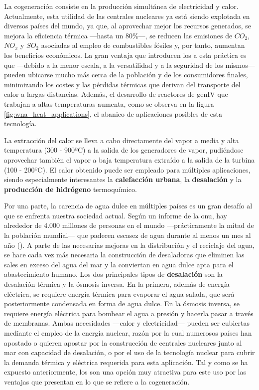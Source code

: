 La cogeneración consiste en la producción simultánea de electricidad y calor. Actualmente, esta utilidad de las centrales nucleares ya está siendo explotada en diversos países del mundo, ya que, al aprovechar mejor los recursos generados, se mejora la eficiencia térmica ---hasta un 80\%---, se reducen las emisiones de $CO_2$, $NO_x$ y $SO_2$ asociadas al empleo de combustibles fósiles y, por tanto, aumentan los beneficios económicos. La gran ventaja que introducen los  a esta práctica es que ---debido a la menor escala, a la versatilidad y a la seguridad de los mismos--- pueden ubicarse mucho más cerca de la población y de los consumidores finales, minimizando los costes y las pérdidas térmicas que derivan del transporte del calor a largas distancias. Además, el desarrollo de reactores de \acrshort{genIV} que trabajan a altas temperaturas aumenta, como se observa en la figura \ref{fig:wna_heat_applications}, el abanico de aplicaciones posibles de esta tecnología.

La extracción del calor se lleva a cabo directamente del vapor a media y alta temperatura (300 - 900ºC) a la salida de los generadores de vapor, pudiéndose aprovechar también el vapor a baja temperatura extraído a la salida de la turbina (100 - 200ºC). El calor obtenido puede ser empleado para múltiples aplicaciones, siendo especialmente interesantes la \textbf{calefacción urbana}, la \textbf{desalación} y la \textbf{producción de hidrógeno} termoquímico. 

Por una parte, la carencia de agua dulce en múltiples países es un gran desafío al que se enfrenta nuestra sociedad actual. Según un informe de la \acrshort{onu}, hay alrededor de 4.000 millones de personas en el mundo ---prácticamente la mitad de la población mundial--- que padecen escasez de agua durante al menos un mes al año (\cite{onu_agua}). A parte de las necesarias mejoras en la distribución y el reciclaje del agua, se hace cada vez más necesaria la construcción de desaladoras que eliminen las sales en exceso del agua del mar y la conviertan en agua dulce apta para el abastecimiento humano. Los dos principales tipos de \textbf{desalación} son la desalación térmica y la ósmosis inversa. En la primera, además de energía eléctrica, se requiere energía térmica para evaporar el agua salada, que será posteriormente condensada en forma de agua dulce. En la ósmosis inversa, se requiere energía eléctrica para bombear el agua a presión y hacerla pasar a través de membranas. Ambas necesidades ---calor y electricidad--- pueden ser cubiertas mediante el empleo de la energía nuclear, razón por la cual numerosos países han apostado  o quieren apostar por la construcción de centrales nucleares junto al mar con capacidad de desalación, o por el uso de la tecnología nuclear para cubrir la demanda térmica y eléctrica requerida para esta aplicación. Tal y como se ha expuesto anteriormente, los  son una opción muy atractiva para este uso por las ventajas que presentan en lo que se refiere a la cogeneración.

